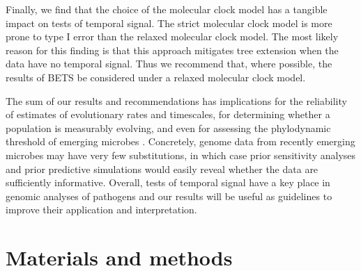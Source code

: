\documentclass[10pt,letterpaper]{article}
\begin{document}
Finally, we find that the choice of the molecular clock model has a tangible impact on tests of temporal signal. The strict molecular clock model is more prone to type I error than the relaxed molecular clock model. The most likely reason for this finding is that this approach mitigates tree extension when the data have no temporal signal. Thus we recommend that, where possible, the results of BETS be considered under a relaxed molecular clock model.


The sum of our results and recommendations has implications for the reliability of estimates of evolutionary rates and timescales, for determining whether a population is measurably evolving, and even for assessing the phylodynamic threshold of emerging microbes \cite{duchene2020temporal}. Concretely, genome data from recently emerging microbes may have very few substitutions, in which case prior sensitivity analyses and prior predictive simulations would easily reveal whether the data are sufficiently informative. Overall, tests of temporal signal have a key place in genomic analyses of pathogens and our results will be useful as guidelines to improve their application and interpretation.

\section*{Materials and methods}
\end{document}
